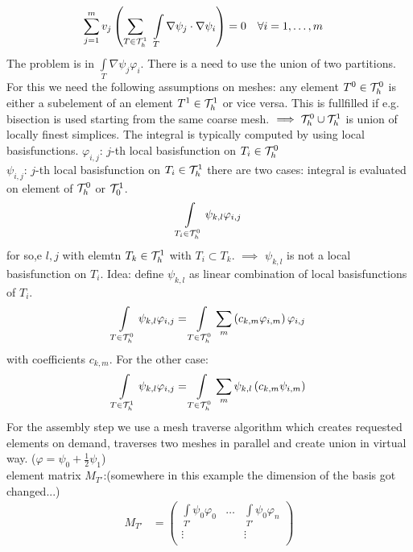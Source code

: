 \begin{example}
\begin{align*}
		\sum \limits_{j=1}^m v_j \left( \sum \limits_{T \in \T^1_h} \ \int \limits_T \nabla \psi_j \cdot \nabla \psi_i \right) &=0 \quad \forall i = 1, \dots,m
	\end{align*}
	The problem is in $\int \limits_T \nabla \psi_j  \varphi_i$. There is a need to use the union of two partitions. For this we need the following assumptions on meshes:\nl
	any element $T^0 \in \mathcal{T}^0_h$ is either a subelement of an element $T^1 \in \mathcal{T}^1_h$ or vice versa.
	This is fullfilled if e.g. bisection is used starting from the same coarse mesh.\nl
	$\implies \mathcal{T}^0_h \cup \mathcal{T}^1_h$ is union of locally finest simplices. The integral is typically computed by using local basisfunctions.\nl
	$\varphi_{i,j}$: $j$-th local basisfunction on $T_i \in \mathcal{T}^0_h$\\
	$\psi_{i,j}$: $j$-th local basisfunction on $T_i \in \mathcal{T}^1_h$\nl
	there are two cases: integral is evaluated on element of $\mathcal{T}^0_h$ or $\mathcal{T}^1_0$.
	\begin{align*}
		\int \limits_{T_i  \in \mathcal{T}^0_h} \psi_{k,l} \varphi_{i,j}
	\end{align*}
	for so,e $l,j$ with elemtn $T_k \in \mathcal{T}^1_h$ with $T_i \subset T_k$. $\implies$ $\psi_{k,l}$ is not a local basisfunction on $T_i$.\nl
	Idea: define $\psi_{k,l}$ as linear combination of local basisfunctions of $T_i$.
	\begin{align*}
		\int \limits_{T \in \mathcal{T}^0_h} \psi_{k,l}\varphi_{i,j} = \int \limits_{T \in \mathcal{T}^0_h} \sum \limits_m \left( c_{k,m} \varphi_{i,m} \right)\varphi_{i,j}
	\end{align*}
	with coefficients $c_{k,m}$. For the other case: 
	\begin{align*}
	\int \limits_{T \in \mathcal{T}^1_h} \psi_{k,l}\varphi_{i,j} = \int \limits_{T \in \mathcal{T}^0_h} \sum \limits_m  \psi_{k,l} \left( c_{k,m} \psi_{i,m} \right)
	\end{align*}
	For the assembly step we use a mesh traverse algorithm which creates requested elements on demand, traverses two meshes in parallel and create union in virtual way.
	($\varphi = \psi_0 + \frac{1}{2}\psi_1$)\\
	element matrix $M_{T'}$:(somewhere in this example the dimension of the basis got changed...) 
	\begin{align*}
		M_{T'}&= 
		\begin{pmatrix}
		\int \limits_{T'} \psi_0\varphi_0 & \dots & \int \limits_{T'} \psi_0\varphi_n \\
		\vdots 					 		  & 	  & \vdots\\

\end{pmatrix}
\end{align*}
\end{example}
